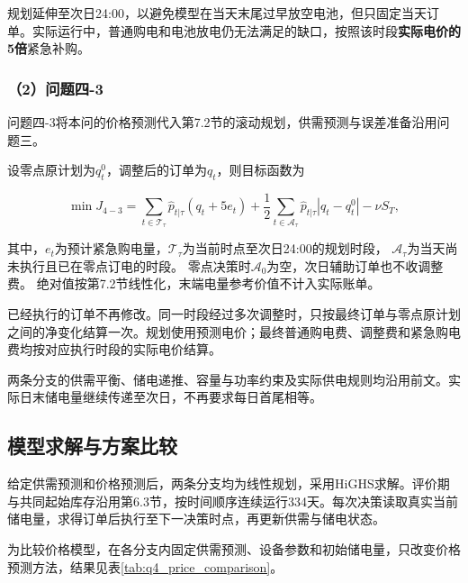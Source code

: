 规划延伸至次日24:00，以避免模型在当天末尾过早放空电池，但只固定当天订单。实际运行中，普通购电和电池放电仍无法满足的缺口，按照该时段\textbf{实际电价的5倍}紧急补购。

\subsubsection*{（2）问题四-3}

问题四-3将本问的价格预测代入第7.2节的滚动规划，供需预测与误差准备沿用问题三。

设零点原计划为$q_t^0$，调整后的订单为$q_t$，则目标函数为

\begin{equation}
\min J_{4-3}
=
\sum_{t\in \mathcal T_{\tau}}
\hat{p}_{t|\tau}
\left(q_t+5e_t\right)
+
\frac{1}{2}
\sum_{t\in \mathcal A_{\tau}}
\hat{p}_{t|\tau}
\left|q_t-q_t^0\right|
-
\nu S_T,
\end{equation}

其中，$e_t$为预计紧急购电量，$\mathcal T_{\tau}$为当前时点至次日24:00的规划时段，
$\mathcal A_{\tau}$为当天尚未执行且已在零点订电的时段。
零点决策时$\mathcal A_0$为空，次日辅助订单也不收调整费。
绝对值按第7.2节线性化，末端电量参考价值不计入实际账单。

已经执行的订单不再修改。同一时段经过多次调整时，只按最终订单与零点原计划之间的净变化结算一次。规划使用预测电价；最终普通购电费、调整费和紧急购电费均按对应执行时段的实际电价结算。

两条分支的供需平衡、储电递推、容量与功率约束及实际供电规则均沿用前文。实际日末储电量继续传递至次日，不再要求每日首尾相等。

\subsection{模型求解与方案比较}

给定供需预测和价格预测后，两条分支均为线性规划，采用HiGHS求解。评价期与共同起始库存沿用第6.3节，按时间顺序连续运行334天。每次决策读取真实当前储电量，求得订单后执行至下一决策时点，再更新供需与储电状态。

为比较价格模型，在各分支内固定供需预测、设备参数和初始储电量，只改变价格预测方法，结果见表\ref{tab:q4_price_comparison}。

